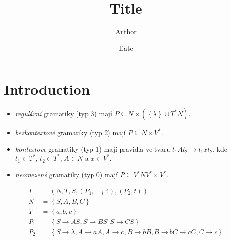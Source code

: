 \documentclass{article}
\title{Title}
\author{Author}
\date{Date}
\begin{document}
\maketitle

\section{Introduction}

\begin{itemize}
    \item \textit{regulární} gramatiky (typ 3) mají
        $P \subseteq N \times \left(\left\{\lambda\right\} \cup T^*N\right)$.
    \item \textit{bezkontextové} gramatiky (typ 2) mají
        $P \subseteq N \times V^*$.
    \item \textit{kontextové} gramatiky (typ 1) mají pravidla ve tvaru
        $t_1At_2 \rightarrow t_1xt_2$, kde $t_1 \in T^*$, $t_2 \in T^*$,
        $A \in N$ a $x \in V^*$.
    \item \textit{neomezené} gramatiky (typ 0) mají
        $P \subseteq V^*NV^* \times V^*$.
\end{itemize}

\begin{align*}
    \Gamma &= (N, T, S, (P_1, =_l4), (P_2, t)) \\
    N      &= \left\{ S, A, B, C \right\} \\
    T      &= \left\{ a, b, c \right\} \\
    P_1    &= \left\{
        S \rightarrow AS, S \rightarrow BS, S \rightarrow CS
    \right\} \\
    P_2    &= \left\{
        S \rightarrow \lambda,
        A \rightarrow aA, A \rightarrow a,
        B \rightarrow bB, B \rightarrow b
        C \rightarrow cC, C \rightarrow c
    \right\}
\end{align*}
\end{document}
